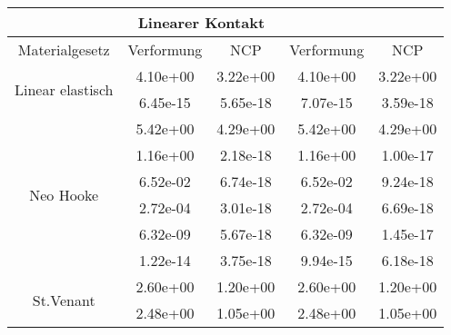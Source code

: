 \begin{table} 
\centering 
\begin{tabular}{c|cc|cc|} 
\cline{2-5} 
 & \multicolumn{2}{|c|}{Linearer Kontakt} &  \\ 
\hline 
\multicolumn{1}{|c|}{Materialgesetz} & \multicolumn{1}{c|}{Verformung} & \multicolumn{1}{c|}{NCP} & \multicolumn{1}{c|}{Verformung} & \multicolumn{1}{c|}{NCP} \\ 
\hline 
\multicolumn{1}{|c|}{\multirow{2}{*}{Linear elastisch}} &\multicolumn{1}{|c|}{  4.10e+00} & \multicolumn{1}{|c|}{  3.22e+00} & \multicolumn{1}{|c|}{  4.10e+00} & \multicolumn{1}{|c|}{  3.22e+00} \\ 
\multicolumn{1}{|c|}{} & \multicolumn{1}{|c|}{  6.45e-15} & \multicolumn{1}{|c|}{  5.65e-18} & \multicolumn{1}{|c|}{  7.07e-15} & \multicolumn{1}{|c|}{  3.59e-18} \\ 
\hline 
\multicolumn{1}{|c|}{\multirow{6}{*}{Neo Hooke}} &\multicolumn{1}{|c|}{  5.42e+00} & \multicolumn{1}{|c|}{  4.29e+00} & \multicolumn{1}{|c|}{  5.42e+00} & \multicolumn{1}{|c|}{  4.29e+00} \\ 
\multicolumn{1}{|c|}{} & \multicolumn{1}{|c|}{  1.16e+00} & \multicolumn{1}{|c|}{  2.18e-18} & \multicolumn{1}{|c|}{  1.16e+00} & \multicolumn{1}{|c|}{  1.00e-17} \\ 
\multicolumn{1}{|c|}{} & \multicolumn{1}{|c|}{  6.52e-02} & \multicolumn{1}{|c|}{  6.74e-18} & \multicolumn{1}{|c|}{  6.52e-02} & \multicolumn{1}{|c|}{  9.24e-18} \\ 
\multicolumn{1}{|c|}{} & \multicolumn{1}{|c|}{  2.72e-04} & \multicolumn{1}{|c|}{  3.01e-18} & \multicolumn{1}{|c|}{  2.72e-04} & \multicolumn{1}{|c|}{  6.69e-18} \\ 
\multicolumn{1}{|c|}{} & \multicolumn{1}{|c|}{  6.32e-09} & \multicolumn{1}{|c|}{  5.67e-18} & \multicolumn{1}{|c|}{  6.32e-09} & \multicolumn{1}{|c|}{  1.45e-17} \\ 
\multicolumn{1}{|c|}{} & \multicolumn{1}{|c|}{  1.22e-14} & \multicolumn{1}{|c|}{  3.75e-18} & \multicolumn{1}{|c|}{  9.94e-15} & \multicolumn{1}{|c|}{  6.18e-18} \\ 
\hline 
\multicolumn{1}{|c|}{\multirow{8}{*}{St.Venant}} &\multicolumn{1}{|c|}{  2.60e+00} & \multicolumn{1}{|c|}{  1.20e+00} & \multicolumn{1}{|c|}{  2.60e+00} & \multicolumn{1}{|c|}{  1.20e+00} \\ 
\multicolumn{1}{|c|}{} & \multicolumn{1}{|c|}{  2.48e+00} & \multicolumn{1}{|c|}{  1.05e+00} & \multicolumn{1}{|c|}{  2.48e+00} & \multicolumn{1}{|c|}{  1.05e+00} \\ 

\end{tabular}
\end{table}
